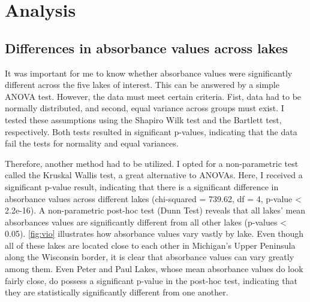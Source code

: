 \documentclass[12pt,]{article}
\newenvironment{Shaded}{\begin{snugshade}}{\end{snugshade}}
\newcommand{\KeywordTok}[1]{\textcolor[rgb]{0.13,0.29,0.53}{\textbf{#1}}}
\newcommand{\StringTok}[1]{\textcolor[rgb]{0.31,0.60,0.02}{#1}}
\newcommand{\CommentTok}[1]{\textcolor[rgb]{0.56,0.35,0.01}{\textit{#1}}}
\newcommand{\OperatorTok}[1]{\textcolor[rgb]{0.81,0.36,0.00}{\textbf{#1}}}
\newcommand{\NormalTok}[1]{#1}
\begin{document}
\newpage

\section{Analysis}\label{analysis}

\subsection{Differences in absorbance values across
lakes}\label{differences-in-absorbance-values-across-lakes}

It was important for me to know whether absorbance values were
significantly different across the five lakes of interest. This can be
answered by a simple ANOVA test. However, the data must meet certain
criteria. Fist, data had to be normally distributed, and second, equal
variance across groups must exist. I tested these assumptions using the
Shapiro Wilk test and the Bartlett test, respectively. Both tests
resulted in significant p-values, indicating that the data fail the
tests for normality and equal variances.

Therefore, another method had to be utilized. I opted for a
non-parametric test called the Kruskal Wallis test, a great alternative
to ANOVAs. Here, I received a significant p-value result, indicating
that there is a significant difference in absorbance values across
different lakes (chi-squared = 739.62, df = 4, p-value \textless{}
2.2e-16). A non-parametric post-hoc test (Dunn Test) reveals that all
lakes' mean absorbances values are significantly different from all
other lakes (p-values \textless{} 0.05). \autoref{fig:vio} illustrates
how absorbance values vary vastly by lake. Even though all of these
lakes are located close to each other in Michigan's Upper Peninsula
along the Wisconsin border, it is clear that absorbance values can vary
greatly among them. Even Peter and Paul Lakes, whose mean absorbance
values do look fairly close, do possess a significant p-value in the
post-hoc test, indicating that they are statistically significantly
different from one another.

\begin{Shaded}
\end{Shaded}
\end{document}
